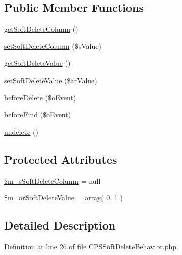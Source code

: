 \subsection*{Public Member Functions}
\begin{DoxyCompactItemize}
\item 
\hyperlink{classCPSSoftDeleteBehavior_acfca6a64b247ac498c62cab1cb17b2bf}{getSoftDeleteColumn} ()
\item 
\hyperlink{classCPSSoftDeleteBehavior_a8403e0437bbd46b1a63d1216d8ef6a9a}{setSoftDeleteColumn} (\$sValue)
\item 
\hyperlink{classCPSSoftDeleteBehavior_a70ab6a41977a11c4db38e4de7bf977e4}{getSoftDeleteValue} ()
\item 
\hyperlink{classCPSSoftDeleteBehavior_a04005e887e480efb1759492f50b54f72}{setSoftDeleteValue} (\$arValue)
\item 
\hyperlink{classCPSSoftDeleteBehavior_a54bb021b1c92fb0f780ad1af74a9019e}{beforeDelete} (\$oEvent)
\item 
\hyperlink{classCPSSoftDeleteBehavior_aa85f738e3261c66a902042efd6f568ef}{beforeFind} (\$oEvent)
\item 
\hyperlink{classCPSSoftDeleteBehavior_a9c49f1fbbec2cb6693f6566bafd3683c}{undelete} ()
\end{DoxyCompactItemize}
\subsection*{Protected Attributes}
\begin{DoxyCompactItemize}
\item 
\hyperlink{classCPSSoftDeleteBehavior_a437e6cd4c0206616755f3d8ccbe23dcd}{\$m\_\-sSoftDeleteColumn} = null
\item 
\hyperlink{classCPSSoftDeleteBehavior_afffc6767951dd7ae09c5571eaf276a47}{\$m\_\-arSoftDeleteValue} = \hyperlink{list_8php_aa3205d038c7f8feb5c9f01ac4dfadc88}{array}( 0, 1 )
\end{DoxyCompactItemize}


\subsection{Detailed Description}


Definition at line 26 of file CPSSoftDeleteBehavior.php.



